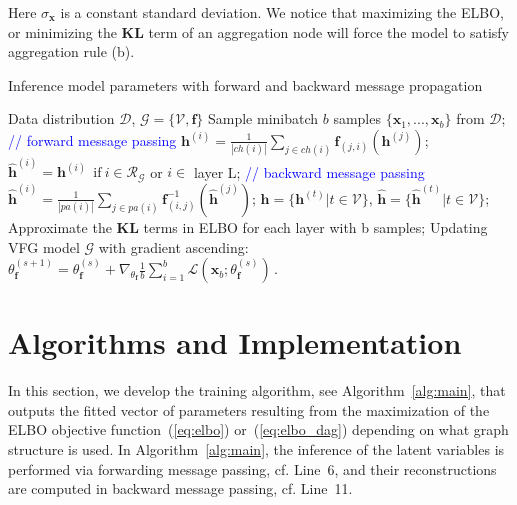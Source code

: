 \documentclass[twoside]{article}
\begin{document}
 Here $\sigma_{\mathbf{x}}$ is a constant standard deviation. 
We notice that maximizing the ELBO, or minimizing the $\mathbf{KL}$ term of an aggregation node will force the model to satisfy aggregation rule (b). 

\begin{algorithm}[H]
   \caption{Inference model parameters with  forward and backward message propagation}
   \label{alg:main}
\begin{algorithmic}[1]
    Data distribution $\mathcal{D}$,  $\mathcal{G} = \{\mathcal{V}, \mathbf{f}\}$
   \STATE  Sample minibatch $b$ samples $\{\mathbf{x}_1, ..., \mathbf{x}_b \}$ from $\mathcal{D}$;
   \label{line:for2}
    \STATE  \textcolor{blue}{// forward message passing}
   \STATE $\mathbf{h}^{(i)} = \frac{1}{|ch(i)|} \sum_{j \in ch(i) } \mathbf{f}_{(j,i)}(\mathbf{h}^{(j)})$; \label{line:forward} 
    \ENDFOR
    \STATE $\widehat{\mathbf{h}}^{(i)} = \mathbf{h}^{(i)} \ \  \text{if} \ i \in \mathcal{R}_{\mathcal{G}} $ or $i \in$ layer L;
   \STATE \textcolor{blue}{// backward message passing}
   \STATE $\widehat{\mathbf{h}}^{(i)} = \frac{1}{|pa(i)|} \sum_{j \in pa(i) } \mathbf{f}^{-1}_{ (i,j)}(\widehat{\mathbf{h}}^{(j)}) $;\label{line:backward}  
   \ENDFOR
    \STATE  $\mathbf{h} =  \{\mathbf{h}^{(t)} \big |  t \in \mathcal{V} \}$, $\widehat{\mathbf{h}} =  \{\widehat{\mathbf{h}}^{(t)} \big | t \in \mathcal{V} \}$;
    \STATE Approximate the $\mathbf{KL}$ terms in ELBO for each layer with b samples;
    \STATE Updating VFG model $\mathcal{G}$ with gradient ascending: $\theta^{(s+1)}_{\mathbf{f}} = \theta^{(s)}_{\mathbf{f}} + \nabla_{\theta_{\mathbf{f}}}\frac{1}{b} \sum_{i=1}^b  \mathcal{L}(\mathbf{x}_b; \theta^{(s)}_{\mathbf{f}})   \, .$\label{line:update} 
   \ENDFOR
\end{algorithmic}
\end{algorithm}

\section{Algorithms and Implementation}\label{sec:algrithm}

In this section, we develop the training algorithm, see Algorithm~\ref{alg:main}, that outputs the fitted vector of parameters resulting from the maximization of the ELBO objective function~(\ref{eq:elbo}) or~(\ref{eq:elbo_dag}) depending on what graph structure is used.
In Algorithm~\ref{alg:main}, the inference of the latent variables is performed via forwarding message passing, cf. Line~6, and their reconstructions are computed in backward message passing, cf. Line~11.
\end{document}
